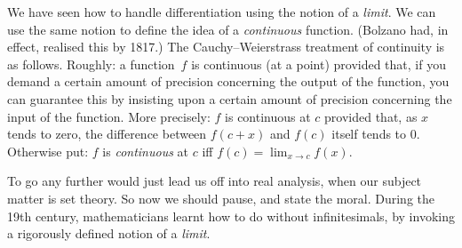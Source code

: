 \documentclass[../../../include/open-logic-section]{subfiles}
\begin{document}
We have seen how to handle differentiation using the notion of a
\emph{limit}. We can use the same notion to define the idea of a
\emph{continuous} function. (Bolzano had, in effect, realised this by
1817.) The Cauchy--Weierstrass treatment of continuity is as follows.
Roughly: a function~$f$ is continuous (at a point) provided that, if
you demand a certain amount of precision concerning the output of the
function, you can guarantee this by insisting upon a certain amount of
precision concerning the input of the function. More precisely: $f$ is
continuous at $c$ provided that, as $x$ tends to zero, the difference
between $f(c + x)$ and $f(c)$ itself tends to $0$. Otherwise put: $f$
is \emph{continuous} at $c$ iff $f(c) = \lim_{x \rightarrow c} f(x)$. 

To go any further would just lead us off into real analysis, when our
subject matter is set theory. So now we should pause, and state the
moral. During the 19th century, mathematicians learnt how to do
without infinitesimals, by invoking a rigorously defined notion of a
\emph{limit}.
\end{document}
